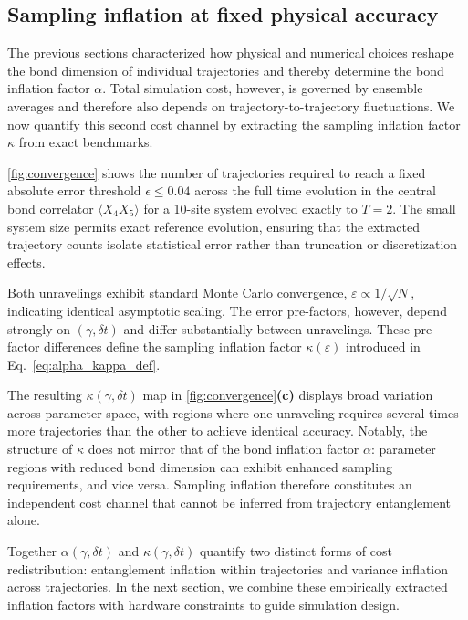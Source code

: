 \documentclass[aps, pra, superscriptaddress, reprint, floatfix]{revtex4-2}
\theoremstyle{plain}
\begin{document}
\subsection{Sampling inflation at fixed physical accuracy}
\label{sec:sampling_inflation}

The previous sections characterized how physical and numerical choices reshape the bond dimension of individual trajectories and thereby determine the bond inflation factor $\alpha$. Total simulation cost, however, is governed by ensemble averages and therefore also depends on trajectory-to-trajectory fluctuations. We now quantify this second cost channel by extracting the sampling inflation factor $\kappa$ from exact benchmarks.

\cref{fig:convergence} shows the 
number of trajectories required to reach a fixed absolute error threshold $\epsilon\leq0.04$ across the full time evolution in the central bond correlator $\langle X_4 X_{5} \rangle$ for a 10-site system evolved exactly to $T=2$. The small system size permits exact reference evolution, ensuring that the extracted trajectory counts isolate statistical error rather than truncation or discretization effects.

Both unravelings exhibit standard Monte Carlo convergence, $\varepsilon \propto {1}/{\sqrt{N}}$, indicating identical asymptotic scaling. The error pre-factors, however, depend strongly on $(\gamma,\delta t)$ and differ substantially between unravelings. These pre-factor differences define the sampling inflation factor $\kappa(\varepsilon)$ introduced in Eq.~\eqref{eq:alpha_kappa_def}.

The resulting $\kappa(\gamma,\delta t)$ map in \cref{fig:convergence}\textbf{(c)} displays broad variation across parameter space, with regions where one unraveling requires several times more trajectories than the other to achieve identical accuracy. Notably, the structure of $\kappa$ does not mirror that of the bond inflation factor $\alpha$: parameter regions with reduced bond dimension can exhibit enhanced sampling requirements, and vice versa. Sampling inflation therefore constitutes an independent cost channel that cannot be inferred from trajectory entanglement alone.

Together $\alpha(\gamma,\delta t)$ and $\kappa(\gamma,\delta t)$ quantify two distinct forms of cost redistribution: entanglement inflation within trajectories and variance inflation across trajectories. In the next section, we combine these empirically extracted inflation factors with hardware constraints to guide simulation design.
\end{document}
